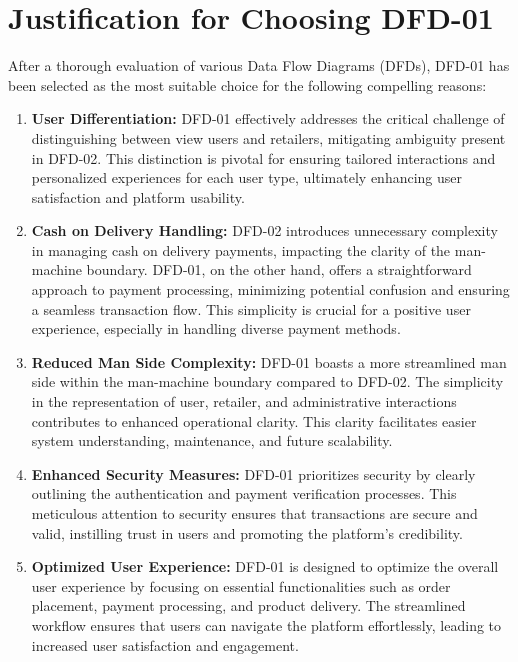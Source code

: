 \documentclass[a4paper,12pt]{article}
\begin{document}
\section{Justification for Choosing DFD-01}

After a thorough evaluation of various Data Flow Diagrams (DFDs), DFD-01 has been selected as the most suitable choice for the following compelling reasons:

\begin{enumerate}
  \item \textbf{User Differentiation:} DFD-01 effectively addresses the critical challenge of distinguishing between view users and retailers, mitigating ambiguity present in DFD-02. This distinction is pivotal for ensuring tailored interactions and personalized experiences for each user type, ultimately enhancing user satisfaction and platform usability.

  \item \textbf{Cash on Delivery Handling:} DFD-02 introduces unnecessary complexity in managing cash on delivery payments, impacting the clarity of the man-machine boundary. DFD-01, on the other hand, offers a straightforward approach to payment processing, minimizing potential confusion and ensuring a seamless transaction flow. This simplicity is crucial for a positive user experience, especially in handling diverse payment methods.

  \item \textbf{Reduced Man Side Complexity:} DFD-01 boasts a more streamlined man side within the man-machine boundary compared to DFD-02. The simplicity in the representation of user, retailer, and administrative interactions contributes to enhanced operational clarity. This clarity facilitates easier system understanding, maintenance, and future scalability.

  \item \textbf{Enhanced Security Measures:} DFD-01 prioritizes security by clearly outlining the authentication and payment verification processes. This meticulous attention to security ensures that transactions are secure and valid, instilling trust in users and promoting the platform's credibility.

  \item \textbf{Optimized User Experience:} DFD-01 is designed to optimize the overall user experience by focusing on essential functionalities such as order placement, payment processing, and product delivery. The streamlined workflow ensures that users can navigate the platform effortlessly, leading to increased user satisfaction and engagement.


\end{enumerate}
\end{document}
